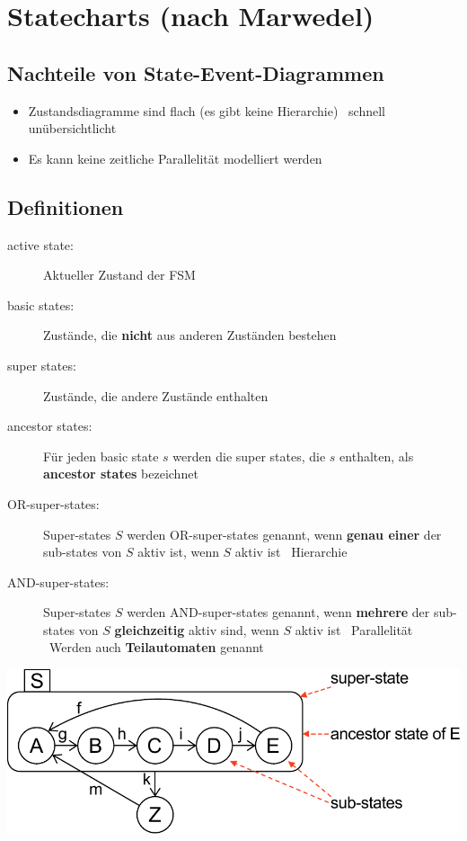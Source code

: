 \section{Statecharts (nach Marwedel)}

\subsection{Nachteile von State-Event-Diagrammen}

\begin{itemize}
    \item Zustandsdiagramme sind flach (es gibt keine Hierarchie) \textrightarrow\ schnell unübersichtlicht
    \item Es kann keine zeitliche Parallelität modelliert werden
\end{itemize}


\subsection{Definitionen}

\begin{description}
    \item[active state:] Aktueller Zustand der FSM
    \item[basic states:] Zustände, die \textbf{nicht} aus anderen Zuständen bestehen
    \item[super states:] Zustände, die andere Zustände enthalten
    \item[ancestor states:] Für jeden basic state $s$ werden die super states, die $s$ enthalten, als \textbf{ancestor states} bezeichnet
    \item[OR-super-states:] Super-states $S$ werden OR-super-states genannt, wenn \textbf{genau einer} der sub-states von $S$ aktiv ist,
        wenn $S$ aktiv ist \textrightarrow\ Hierarchie
    \item[AND-super-states:] Super-states $S$ werden AND-super-states genannt, wenn \textbf{mehrere} der sub-states von $S$ \textbf{gleichzeitig} 
        aktiv sind, wenn $S$ aktiv ist \textrightarrow\ Parallelität \\
        \textrightarrow\ Werden auch \textbf{Teilautomaten} genannt
\end{description}

\begin{center}
    \includegraphics[width=0.85\columnwidth]{images/statechart_definition.pdf}
\end{center}


